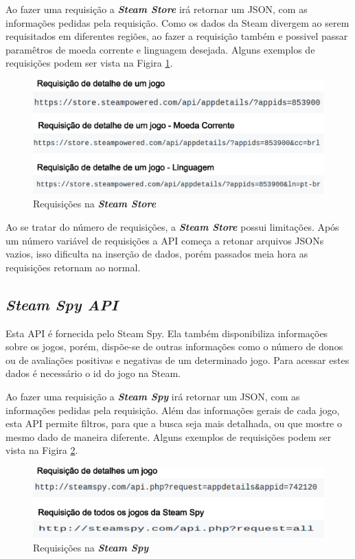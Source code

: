 Ao fazer uma requisição a \textit{\textbf{Steam Store}} irá retornar um JSON, com as informações pedidas pela requisição. Como os dados da Steam divergem ao serem requisitados em diferentes regiões, ao fazer a requisição também e possivel passar paramêtros de moeda corrente e linguagem desejada. Alguns exemplos de requisições podem ser vista na Figira \ref{image:requiStore}.
\begin{figure} [H]
\centering
\includegraphics[scale=0.5]{figuras/requisicaoStore.eps}
\caption{Requisições na \textit{\textbf{Steam Store}}}
\label{image:requiStore}
\end{figure}

Ao se tratar do número de requisições, a \textit{\textbf{Steam Store}} possui limitações. Após um número variável de requisições a API começa a retonar arquivos JSONs vazios, isso dificulta na inserção de dados, porém passados meia hora as requisições retornam ao normal.

\subsection*{\textit{Steam Spy API}}
Esta API é fornecida pelo Steam Spy. Ela também disponibiliza informações sobre os jogos, porém, dispõe-se de outras informações como o número de donos ou de avaliações positivas e negativas de um determinado jogo. Para acessar estes dados é necessário o id do jogo na Steam.

Ao fazer uma requisição a \textit{\textbf{Steam Spy}} irá retornar um JSON, com as informações pedidas pela requisição. Além das informações gerais de cada jogo, esta API permite filtros, para que a busca seja mais detalhada, ou que mostre o mesmo dado de maneira diferente. Alguns exemplos de requisições podem ser vista na Figira \ref{image:requiSpy}.
\begin{figure} [H]
\centering
\includegraphics[scale=0.5]{figuras/requisicaoSpy.eps}
\caption{Requisições na \textit{\textbf{Steam Spy}}}
\label{image:requiSpy}
\end{figure}

